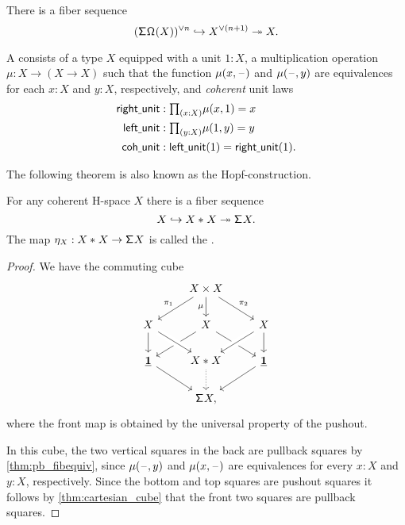 \begin{cor}
There is a fiber sequence
\begin{equation*}
(\mathsf{\Sigma}^{}\mathsf{\Omega}^{}(X))^{\vee n} \hookrightarrow X^{\vee (n+1)} \twoheadrightarrow X.
\end{equation*}
\end{cor}

\begin{defn}\label{defn:coh_hspace}
A  consists of a type $X$ equipped with a unit $1:X$, a multiplication operation $\mu:X \to (X \to X)$ such that the function $\mu(x,\mathord{\hspace{1pt}\text{--}\hspace{1pt}})$ and $\mu(\mathord{\hspace{1pt}\text{--}\hspace{1pt}},y)$ are equivalences for each $x:X$ and $y:X$, respectively, and \emph{coherent} unit laws
\begin{align*}
\mathsf{right\usc{}unit} & : \prd{x: X} \mu(x,1)= x \\
\mathsf{left\usc{}unit} & : \prd{y:X} \mu(1,y) = y \\
\mathsf{coh\usc{}unit} & : \mathsf{left\usc{}unit}(1)=\mathsf{right\usc{}unit}(1).
\end{align*}
\end{defn}

The following theorem is also known as the Hopf-construction.

\begin{thm}\label{thm:hopf_construction}
For any coherent H-space $X$ there is a fiber sequence
\begin{equation*}
X \hookrightarrow {X}\ast_{}{X} \twoheadrightarrow \mathsf{\Sigma}^{} X.
\end{equation*}
The map $\eta_X:{X}\ast_{}{X}\to \mathsf{\Sigma}^{} X$ is called the .
\end{thm}

\begin{proof}
We have the commuting cube
\begin{equation*}
\begin{tikzcd}
& X \times X \arrow[dl,swap,"\pi_1"] \arrow[d,swap,"\mu"] \arrow[dr,"\pi_2"] \\
X \arrow[d] & X \arrow[dl] \arrow[dr] & X \arrow[dl,crossing over] \arrow[d] \\
\unit \arrow[dr] & \join{X}{X} \arrow[from=ul,crossing over] \arrow[d,densely dotted] & \unit \arrow[dl] \\
& \susp X,
\end{tikzcd}
\end{equation*}
where the front map is obtained by the universal property of the pushout.

In this cube, the two vertical squares in the back are pullback squares by \cref{thm:pb_fibequiv}, since $\mu(\mathord{\hspace{1pt}\text{--}\hspace{1pt}},y)$ and $\mu(x,\mathord{\hspace{1pt}\text{--}\hspace{1pt}})$ are equivalences for every $x:X$ and $y:X$, respectively. Since the bottom and top squares are pushout squares it follows by \cref{thm:cartesian_cube} that the front two squares are pullback squares.
\end{proof}
